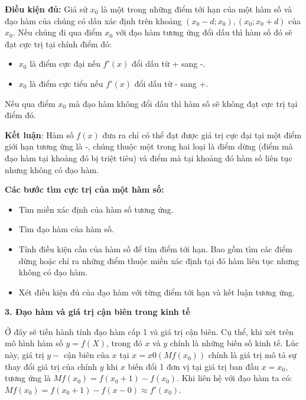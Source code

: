 \documentclass[12pt,a4paper]{report}
\begin{document}
\textbf{Điều kiện đủ:} Giả sử $x_0$ là một trong những điểm tới hạn của một hàm số và đạo hàm của chúng có dấu xác định trên khoảng $(x_0 - d; x_0), (x_0; x_0 + d)$ của $x_0$. Nếu chúng đi qua điểm $x_0$ với đạo hàm tương ứng đổi dấu thì hàm số đó sẽ đạt cực trị tại chính điểm đó:
\begin{itemize}
    \item $x_0$ là điểm cực đại nếu $f'(x)$ đổi dấu từ + sang -.
    \item $x_0$ là điểm cực tiểu nếu $f'(x)$ đổi dấu từ - sang +.
\end{itemize}

Nếu qua điểm $x_0$ mà đạo hàm không đổi dấu thì hàm số sẽ không đạt cực trị tại điểm đó.

\textbf{Kết luận}: Hàm số $f(x)$ đưa ra chỉ có thể đạt được giá trị cực đại tại một điểm giới hạn tương ứng là -, chúng thuộc một trong hai loại là điểm dừng (điểm mà đạo hàm tại khoảng đó bị triệt tiêu) và điểm mà tại khoảng đó hàm số liên tục nhưng không có đạo hàm.

\textbf{Các bước tìm cực trị của một hàm số:}
\begin{itemize}
    \item Tìm miền xác định của hàm số tương ứng.
    \item Tìm đạo hàm của hàm số.
    \item Tính điều kiện cần của hàm số để tìm điểm tới hạn. Bao gồm tìm các điểm dừng hoặc chỉ ra những điểm thuộc miền xác định tại đó hàm liên tục nhưng không có đạo hàm.
    \item Xét điều kiện đủ của đạo hàm với từng điểm tới hạn và kết luận tương ứng.
\end{itemize}

\textbf{3. Đạo hàm và giá trị cận biên trong kinh tế}

Ở đây sẽ tiến hành tính đạo hàm cấp 1 và giá trị cận biên. Cụ thể, khi xét trên mô hình hàm số $y = f(X)$, trong đó $x$ và $y$ chính là những biến số kinh tế. Lúc này, giá trị $y-$ cận biên của $x$ tại $x = x0 (Mf(x_0))$ chính là giá trị mô tả sự thay đổi giá trị của chính $y$ khi $x$ biến đổi 1 đơn vị tại giá trị ban đầu $x = x_0$, tương ứng là $Mf(x_0) = f(x_0+1) - f(x_0)$. Khi liên hệ với đạo hàm ta có: $Mf(x_0) = f(x_0+1) - f(x-0) \approx f'(x_0)$.
\end{document}
